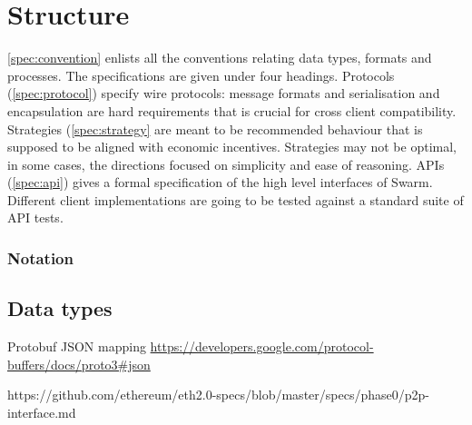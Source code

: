 \section{Structure}\label{spec:conventions}

\ref{spec:convention} enlists all the conventions relating data types, formats and processes.
The specifications are given under four headings. Protocols 
(\ref{spec:protocol}) specify wire protocols: message formats and serialisation and encapsulation are hard requirements that is crucial for  cross client compatibility.
Strategies (\ref{spec:strategy} are meant to be recommended  behaviour that is supposed to be aligned with economic incentives.
Strategies may not be optimal, in some cases, the directions focused on simplicity and ease of reasoning.
APIs (\ref{spec:api}) gives a formal specification of the high level interfaces of Swarm. Different client implementations are going to be tested against a standard suite of API tests.


\subsubsection{Notation}\label{spec:notation}

\subsection{Data types}

Protobuf JSON mapping \url{https://developers.google.com/protocol-buffers/docs/proto3#json}

https://github.com/ethereum/eth2.0-specs/blob/master/specs/phase0/p2p-interface.md
